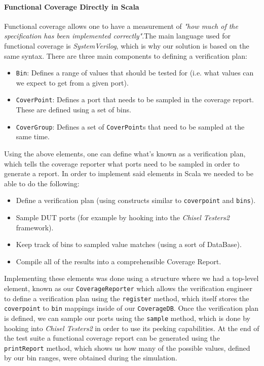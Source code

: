 \documentclass[runningheads]{llncs}
\begin{document}
\paragraph{Functional Coverage Directly in Scala}
Functional coverage allows one to have a measurement of \textit{"how much of the specification has been implemented correctly"}.The main language used for functional coverage is \textit{SystemVerilog}, which is why our solution is based on the same syntax. There are three main components to defining a verification plan: 
\begin{itemize}
\item \texttt{Bin}: Defines a range of values that should be tested for (i.e. what values can we expect to get from a given port).
\item \texttt{CoverPoint}: Defines a port that needs to be sampled in the coverage report. These are defined using a set of bins.
\item \texttt{CoverGroup}: Defines a set of \texttt{CoverPoint}s that need to be sampled at the same time.
\end{itemize}
Using the above elements, one can define what's known as a verification plan, which tells the coverage reporter what ports need to be sampled in order to generate a report.
In order to implement said elements in Scala we needed to be able to do the following:
\begin{itemize}
\item Define a verification plan (using constructs similar to \texttt{coverpoint} and \texttt{bins}).
\item Sample DUT ports (for example by hooking into the \textit{Chisel Testers2} framework).
\item Keep track of bins to sampled value matches (using a sort of DataBase).
\item Compile all of the results into a comprehensible Coverage Report.
\end{itemize}
Implementing these elements was done using a structure where we had a top-level element, known as our \texttt{CoverageReporter} which allows the verification engineer to define a verification plan using the \texttt{register} method, which itself stores the \texttt{coverpoint} to \texttt{bin} mappings inside of our \texttt{CoverageDB}. Once the verification plan is defined, we can sample our ports using the \texttt{sample} method, which is done by hooking into \textit{Chisel Testers2} in order to use its peeking capabilities. At the end of the test suite a functional coverage report can be generated using the \texttt{printReport} method, which shows us how many of the possible values, defined by our bin ranges, were obtained during the simulation.
\end{document}
